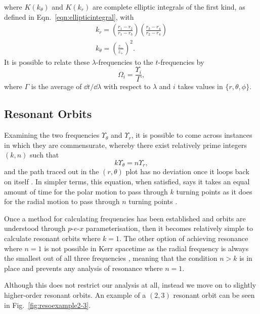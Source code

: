 where $K(k_\theta)$ and $K(k_r)$ are complete elliptic integrals of the first kind, as defined in Eqn.~\eqref{eqn:ellipticintegral}, with
\begin{gather}
k_r=\left(\frac{r_1-r_2}{r_1-r_3}\right)\left(\frac{r_3-r_4}{r_2-r_4}\right)\\
k_\theta=\left(\frac{z_-}{z_+} \right)^2.
\end{gather}
It is possible to relate these $\lambda$-frequencies to the $t$-frequencies by
\begin{equation}
\Omega_i=\frac{\Upsilon_i}{\Gamma},
\end{equation}
where $\Gamma$ is the average of $\dd{t}/\dd{\lambda}$ with respect to $\lambda$ and $i$ takes values in $\{r,\theta,\phi\}$.


\subsection{Resonant Orbits}
Examining the two frequencies $\Upsilon_\theta$ and $\Upsilon_r$, it is possible to come across instances in which they are commensurate, whereby there exist relatively prime integers $(k,n)$ such that
\begin{equation}\label{eqn:resCond}
    k\Upsilon_\theta=n\Upsilon_r,
\end{equation}
and the path traced out in the $(r,\theta)$ plot has no deviation once it loops back on itself \cite{ResonantCensus}.
In simpler terms, this equation, when satisfied, says it takes an equal amount of time for the polar motion to pass through $k$ turning points as it does for the radial motion to pass through $n$ turning points \cite{brinkKerrResonance}. 

Once a method for calculating frequencies has been established and orbits are understood through $p$-$e$-$x$ parameterisation, then it becomes relatively simple to calculate resonant orbits where $k=1$.
The other option of achieving resonance where $n=1$ is not possible in Kerr spacetime as the radial frequency is always the smallest out of all three frequencies \cite{brinkKerrResonance}, meaning that the condition $n>k$ is in place and prevents any analysis of resonance where $n=1$.

Although this does not restrict our analysis at all, instead we move on to slightly higher-order resonant orbits.
An example of a $(2,3)$ resonant orbit can be seen in Fig.~\eqref{fig:resoexample2-3}.

